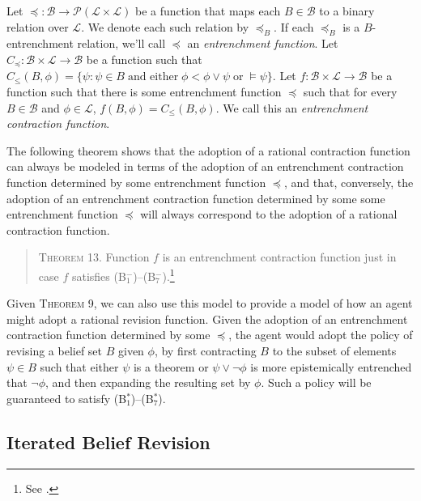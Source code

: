 Let $\preceq : \mathcal{B} \rightarrow \mathcal{P}(\mathcal{L} \times \mathcal{L})$ be a function that maps each $B \in \mathcal{B}$ to a binary relation over $\mathcal{L}$.
We denote each such relation by $\preceq_B$.
If each $\preceq_B$ is a $B$-entrenchment relation, we'll call $\preceq$ an \textit{entrenchment function}.
Let $C_{\preceq}: \mathcal{B} \times \mathcal{L} \rightarrow \mathcal{B}$ be a function such that $C_{\leq}(B, \phi) = \{\psi: \psi \in B \; \text{and either} \; \phi < \phi \vee \psi \; \text{or} \; \models \psi \}$.
Let $f: \mathcal{B} \times \mathcal{L} \rightarrow \mathcal{B}$ be a function such that there is some entrenchment function $\preceq$ such that for every $B \in \mathcal{B}$ and $\phi \in \mathcal{L}$, $f(B, \phi) = C_{\leq}(B, \phi)$.
We call this an \textit{entrenchment contraction function}.

The following theorem shows that the adoption of a rational contraction function can always be modeled in terms of the adoption of an entrenchment contraction function determined by some entrenchment function $\preceq$, and that, conversely, the adoption of an entrenchment contraction function determined by some some entrenchment function $\preceq$ will always correspond to the adoption of a rational contraction function.
\begin{quote}
\textsc{Theorem 13.}\; Function $f$ is an entrenchment contraction function just in case $f$ satisfies (B$^-_1$)--(B$^-_7$).\footnote{See \citet{GardenforsMakinson1}.}
\end{quote}

Given \textsc{Theorem 9}, we can also use this model to provide a model of how  an agent might adopt a rational revision function. 
Given the adoption of an entrenchment contraction function determined by some $\preceq$, the agent would adopt the policy of revising a belief set $B$ given $\phi$, by first contracting $B$ to the subset of elements $\psi \in B$ such that either $\psi$ is a theorem or $\psi \vee \lnot \phi$ is more epistemically entrenched that $\lnot \phi$, and then expanding the resulting set by $\phi$.
Such a policy will be guaranteed to satisfy (B$^*_1$)--(B$^*_7$).


\subsection{Iterated Belief Revision}\label{caie-section2-4}

